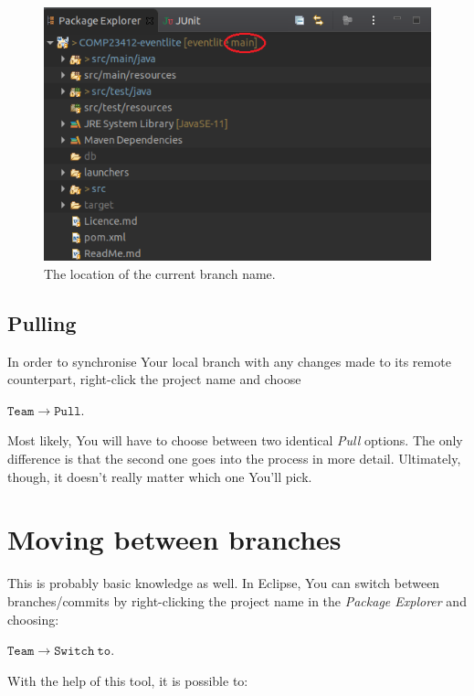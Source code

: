 \documentclass{article}
\begin{document}
\begin{figure}[h]
    \centering
    \includegraphics[scale=0.6]{branch_name.png}
    \caption{The location of the current branch name.}
    \label{fig:branch_name}
\end{figure}

\subsection{Pulling}
\label{sec:pulling}

In order to synchronise Your local branch with any changes made to its remote counterpart, right-click the project name and choose

$\mathtt{Team \rightarrow Pull}$. \newline

Most likely, You will have to choose between two identical \textit{Pull} options. The only difference is that the second one goes into the process in more detail. Ultimately, though, it doesn't really matter which one You'll pick.

\section{Moving between branches}
\label{sec:switching}

This is probably basic knowledge as well. In Eclipse, You can switch between branches/commits by right-clicking the project name in the \textit{Package Explorer} and choosing:\newline

$\mathtt{Team \rightarrow Switch\ to}$.\newline

With the help of this tool, it is possible to:
\end{document}
